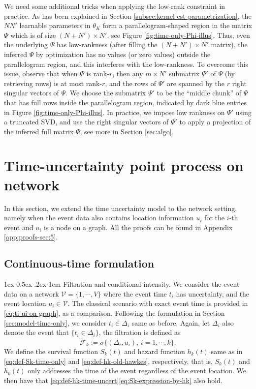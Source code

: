 \documentclass[11pt]{article}
\makeatletter
\theoremstyle{remark}
\theoremstyle{plain}
\newcommand{\calF}{\mathcal{F}}
\newcommand{\calV}{\mathcal{V}}
\renewcommand{\paragraph}{%
  \@startsection{paragraph}{4}%
  {\z@}{1ex \@plus 0.5ex \@minus .2ex}{-1em}%
  {\normalfont\normalsize\itshape}%
}
\makeatother
\begin{document}
We need some additional tricks when applying the low-rank constraint in practice. 
As has been explained in Section \ref{subsec:kernel-est-parametrization}, the $NN'$ learnable parameters in $\theta_K$ form a parallelogram-shaped region in the matrix $\Psi$ which is of size $(N+N')\times N'$, see Figure \ref{fig:time-only-Phi-illus}. Thus, even the underlying $\Psi$ has low-rankness (after filling the $(N+N')\times N'$ matrix), the inferred $\Psi$ by optimization has no values (or zero values) outside the parallelogram region, and this interferes with the low-rankness. 
%
To overcome this issue, observe that when $\Psi$ is rank-$r$, then any $m\times N'$ submatrix $\Psi'$ of $\Psi$ (by retrieving rows) is at most rank-$r$,  and the rows of $\Psi'$ are spanned by the $r$ right singular vectors of $\Psi$. We choose the submatrix $\Psi' $ to be the ``middle chunk'' of $\Psi$ that has full rows inside the parallelogram region, indicated by dark blue entries in Figure \ref{fig:time-only-Phi-illus}. In practice, we impose low rankness on $\Psi'$ using a truncated SVD, and use the right singular vectors of $\Psi'$ to apply a projection of the inferred full matrix $\Psi$, see more in Section \ref{sec:algo}.




\section{Time-uncertainty point process on network}\label{sec:model-with-graph}

In this section, we extend the time uncertainty model to the network setting, namely when the event data also contains location information $u_i$ for the $i$-th event and $u_i$ is a node on a graph. 
All the proofs can be found in Appendix \ref{app:proofs-sec:5}.


\subsection{Continuous-time formulation}\label{subsec:model-graph-cont-time}

\paragraph{Filtration and conditional intensity.}
We consider the event data on a network $\calV = \{1, \cdots, V \}$ where the event time $t_i$ has uncertainty, and the event location $u_i \in \calV$.
The classical scenario with exact event time is provided in \eqref{eq:ti-ui-on-graph}, as a comparison. 
Following the formulation in Section \ref{sec:model-time-only}, we consider $t_i \in \Delta_i$ same as before. 
Again, let $\Delta_i$ also denote the event that $\{ t_i \in \Delta_i \}$, the filtration is defined as 
\[
\tilde{\calF}_k :=  \sigma\{ ( \Delta_i, u_i), \, i=1, \cdots, k \}.
\]
We define the survival function $S_k(t)$ and hazard function $h_k(t)$ same as in \eqref{eq:def-Sk-time-only} and \eqref{eq:def-hk-old-hawkes}, respectively, that is, $S_k(t)$ and $h_k(t)$ only addresses the time of the event regardless of the event location.
We then have that \eqref{eq:def-hk-time-uncert}\eqref{eq:Sk-expression-by-hk} also hold.
\end{document}
